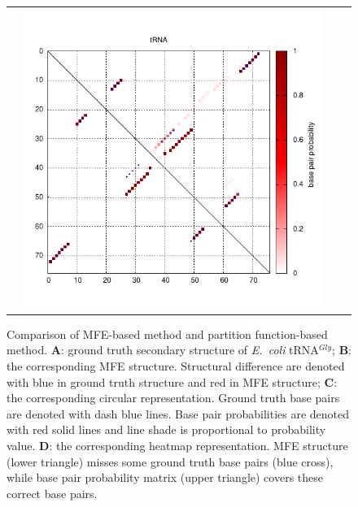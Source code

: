 \begin{figure}[t]
\begin{tabular}{cccc}
&
\includegraphics[scale=0.4]{figs/tRNA_heatmap_dark}

\end{tabular}
\caption{
Comparison of MFE-based method and partition function-based method. 
    {\bf A}: ground truth secondary structure of {\it E.~coli} tRNA$^\textit{Gly}$; 
    {\bf B}: the corresponding MFE structure. 
    Structural difference are denoted with blue in ground truth structure and red in MFE structure;
    {\bf C}: the corresponding circular representation.
    Ground truth base pairs are denoted with dash blue lines. 
    Base pair probabilities are denoted with red solid lines and line shade is proportional to probability value.
    {\bf D}: the corresponding heatmap representation.
    MFE structure (lower triangle) misses some ground truth base pairs (blue cross), 
    while base pair probability matrix (upper triangle) covers these correct base pairs. 
\label{tRNA}}
\end{figure}

